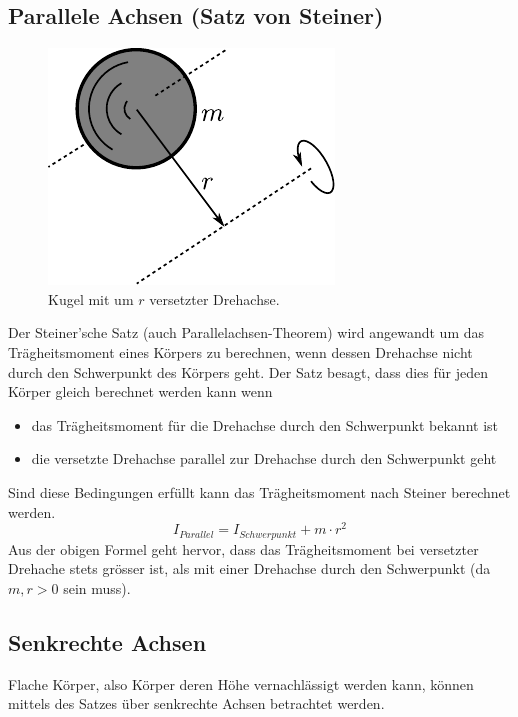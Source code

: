 \subsection{Parallele Achsen (Satz von Steiner)}
\begin{figure}[h!]
	\centering
	\includegraphics[scale=0.7]{../fig/steiner.pdf}
	\caption{Kugel mit um $r$ versetzter Drehachse.}
	\label{fig:steiner}
\end{figure}

\noindent
Der Steiner'sche Satz (auch Parallelachsen-Theorem) wird angewandt um
das Trägheitsmoment eines Körpers zu berechnen, wenn dessen Drehachse nicht
durch den Schwerpunkt des Körpers geht. Der Satz besagt, dass dies für 
jeden Körper gleich berechnet werden kann wenn
\begin{itemize}
	\item das Trägheitsmoment für die Drehachse durch den Schwerpunkt
		bekannt ist
	\item die versetzte Drehachse parallel zur Drehachse durch den
		Schwerpunkt geht
\end{itemize}
Sind diese Bedingungen erfüllt kann das Trägheitsmoment nach Steiner
berechnet werden.
\[ \boxed{ I_{Parallel} = I_{Schwerpunkt} + m \cdot r^2 } \]
Aus der obigen Formel geht hervor, dass das Trägheitsmoment bei versetzter
Drehache stets grösser ist, als mit einer Drehachse durch den Schwerpunkt
(da $m,r>0$ sein muss).

\subsection{Senkrechte Achsen}
Flache Körper, also Körper deren Höhe vernachlässigt werden kann, können
mittels des Satzes über senkrechte Achsen betrachtet werden.

